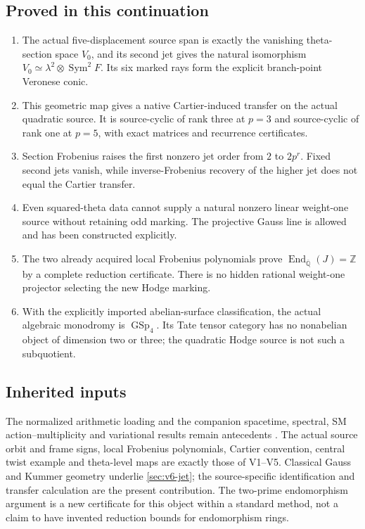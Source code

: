 \documentclass[11pt]{article}
\theoremstyle{definition}
\theoremstyle{remark}
\newcommand{\Q}{\mathbb Q}
\newcommand{\Z}{\mathbb Z}
\newcommand{\End}{\operatorname{End}}
\begin{document}
\subsection{Proved in this continuation}
\begin{enumerate}[label=\textup{(P6.\arabic*)},leftmargin=3.6em]
\item The actual five-displacement source span is exactly the vanishing
      theta-section space $V_0$, and its second jet gives the natural
      isomorphism $V_0\simeq\lambda^2\otimes\operatorname{Sym}^2F$.
      Its six marked rays form the explicit branch-point Veronese conic.
\item This geometric map gives a native Cartier-induced transfer on
      the actual quadratic source. It is source-cyclic of rank three
      at $p=3$ and source-cyclic of rank one at $p=5$, with exact
      matrices and recurrence certificates.
\item Section Frobenius raises the first nonzero jet order from $2$
      to $2p^r$. Fixed second jets vanish, while inverse-Frobenius
      recovery of the higher jet does not equal the Cartier transfer.
\item Even squared-theta data cannot supply a natural nonzero linear
      weight-one source without retaining odd marking. The projective
      Gauss line is allowed and has been constructed explicitly.
\item The two already acquired local Frobenius polynomials prove
      $\End_{\overline{\Q}}(J)=\Z$ by a complete reduction certificate.
      There is no hidden rational weight-one projector selecting the
      new Hodge marking.
\item With the explicitly imported abelian-surface classification, the
      actual algebraic monodromy is $\operatorname{GSp}_4$. Its Tate tensor
      category has no nonabelian object of dimension two or three;
      the quadratic Hodge source is not such a subquotient.
\end{enumerate}

\subsection{Inherited inputs}
The normalized arithmetic loading and the companion spacetime, spectral,
SM action--multiplicity and variational results remain antecedents
\cite{GT77,Arithmetic,Spacetime,Spectral,Duality,Variational}.
The actual source orbit and frame signs, local Frobenius polynomials,
Cartier convention, central twist example and theta-level maps are
exactly those of V1--V5. Classical Gauss and Kummer geometry underlie
\cref{sec:v6-jet}; the source-specific identification and transfer
calculation are the present contribution. The two-prime endomorphism
argument is a new certificate for this object within a standard method,
not a claim to have invented reduction bounds for endomorphism rings.
\end{document}
